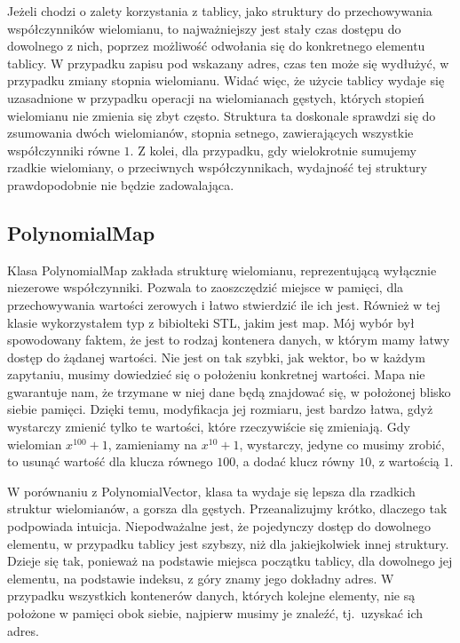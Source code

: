Jeżeli chodzi o zalety korzystania z tablicy, jako struktury do przechowywania współczynników wielomianu, to najważniejszy jest stały czas dostępu do dowolnego z nich, poprzez możliwość odwołania się do konkretnego elementu tablicy. W przypadku zapisu pod wskazany adres, czas ten może się wydłużyć, w przypadku zmiany stopnia wielomianu. Widać więc, że użycie tablicy wydaje się uzasadnione w przypadku operacji na wielomianach gęstych, których stopień wielomianu nie zmienia się zbyt często. Struktura ta doskonale sprawdzi się do zsumowania dwóch wielomianów, stopnia setnego, zawierających wszystkie współczynniki równe $1$. Z kolei, dla przypadku, gdy wielokrotnie sumujemy rzadkie wielomiany, o przeciwnych współczynnikach, wydajność tej struktury prawdopodobnie nie będzie zadowalająca.

\subsection{PolynomialMap}

Klasa PolynomialMap zakłada strukturę wielomianu, reprezentującą wyłącznie niezerowe współczynniki.
Pozwala to zaoszczędzić miejsce w pamięci, dla przechowywania wartości zerowych i łatwo stwierdzić ile ich jest. Również w tej klasie wykorzystałem typ z bibiolteki STL, jakim jest map. Mój wybór był spowodowany faktem, że jest to rodzaj kontenera danych, w którym mamy łatwy dostęp do żądanej wartości. Nie jest on tak szybki, jak wektor, bo w każdym zapytaniu, musimy dowiedzieć się o położeniu konkretnej wartości. Mapa nie gwarantuje nam, że trzymane w niej dane będą znajdować się, w położonej blisko siebie pamięci. Dzięki temu, modyfikacja jej rozmiaru, jest bardzo łatwa, gdyż wystarczy zmienić tylko te wartości, które rzeczywiście się zmieniają. Gdy wielomian $x^{100} + 1$, zamieniamy na $x^{10} + 1$, wystarczy, jedyne co musimy zrobić, to usunąć wartość dla klucza równego $100$, a dodać klucz równy $10$, z wartością $1$.

W porównaniu z PolynomialVector, klasa ta wydaje się lepsza dla rzadkich struktur wielomianów, a gorsza dla gęstych. Przeanalizujmy krótko, dlaczego tak podpowiada intuicja. Niepodważalne jest, że pojedynczy dostęp do dowolnego elementu, w przypadku tablicy jest szybszy, niż dla jakiejkolwiek innej struktury. Dzieje się tak, ponieważ na podstawie miejsca początku tablicy, dla dowolnego jej elementu, na podstawie indeksu, z góry znamy jego dokładny adres. W przypadku wszystkich kontenerów danych, których kolejne elementy, nie są położone w pamięci obok siebie, najpierw musimy je znaleźć, tj.\ uzyskać ich adres.

